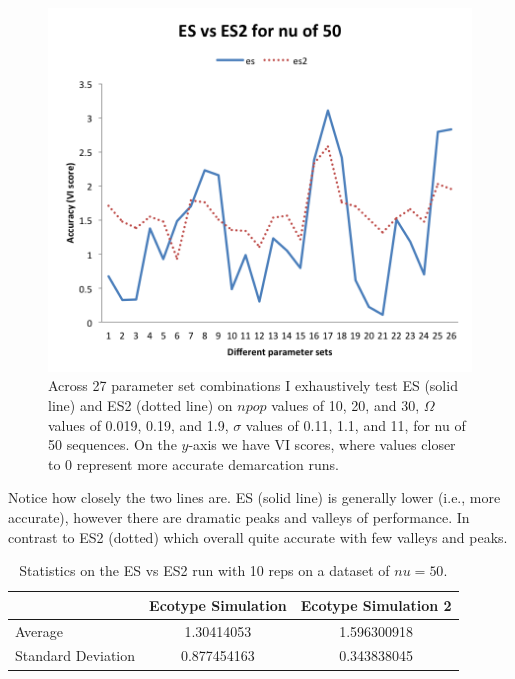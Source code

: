 \begin{figure}[h!]
  \centering
    \includegraphics[scale=0.75]{images/ResultGraphs/ResultGraphs-4}
      \caption[ES vs ES2 accuracy visualization on $nu = 50$.]{Across 27 parameter set combinations I exhaustively test ES (solid line) and ES2 (dotted line) on $npop$ values of 10, 20, and 30, $\Omega$ values of 0.019, 0.19, and 1.9, $\sigma$ values of 0.11, 1.1, and 11, for nu of 50 sequences. On the $y$-axis we have VI scores, where values closer to 0 represent more accurate demarcation runs.}
    \label{fig:ESvES2}
\end{figure}

Notice how closely the two lines are.
ES (solid line) is generally lower (i.e., more accurate), however there are dramatic peaks and valleys of performance.
In contrast to ES2 (dotted) which overall quite accurate with few valleys and peaks.

\begin{table}
    \begin{tabular}{l|cc}
    ~                  & Ecotype Simulation & Ecotype Simulation 2 \\ \hline
    Average            & 1.30414053         & 1.596300918          \\
    Standard Deviation & 0.877454163        & 0.343838045          \\
    \end{tabular}
    \caption[ES versus ES2 statistics.]{Statistics on the ES vs ES2 run with 10 reps on a dataset of $nu=50$.}
    \label{tab:ESvES2mean}
\end{table}

